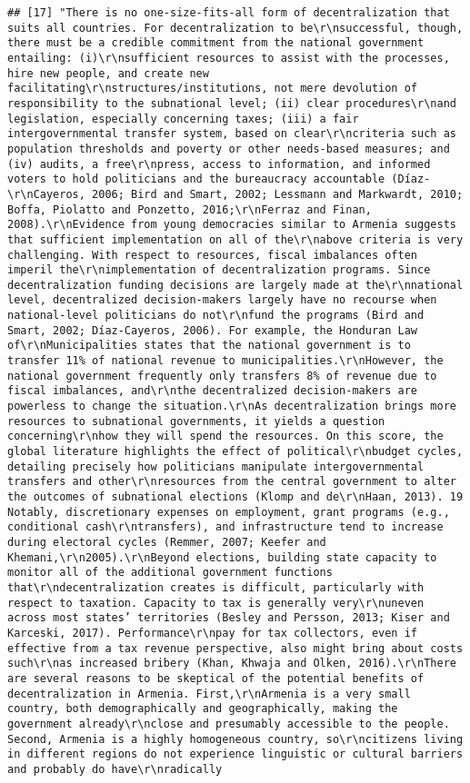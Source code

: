 \documentclass[
]{article}
\begin{document}
\begin{verbatim}
## [17] "There is no one-size-fits-all form of decentralization that suits all countries. For decentralization to be\r\nsuccessful, though, there must be a credible commitment from the national government entailing: (i)\r\nsufficient resources to assist with the processes, hire new people, and create new facilitating\r\nstructures/institutions, not mere devolution of responsibility to the subnational level; (ii) clear procedures\r\nand legislation, especially concerning taxes; (iii) a fair intergovernmental transfer system, based on clear\r\ncriteria such as population thresholds and poverty or other needs-based measures; and (iv) audits, a free\r\npress, access to information, and informed voters to hold politicians and the bureaucracy accountable (Díaz-\r\nCayeros, 2006; Bird and Smart, 2002; Lessmann and Markwardt, 2010; Boffa, Piolatto and Ponzetto, 2016;\r\nFerraz and Finan, 2008).\r\nEvidence from young democracies similar to Armenia suggests that sufficient implementation on all of the\r\nabove criteria is very challenging. With respect to resources, fiscal imbalances often imperil the\r\nimplementation of decentralization programs. Since decentralization funding decisions are largely made at the\r\nnational level, decentralized decision-makers largely have no recourse when national-level politicians do not\r\nfund the programs (Bird and Smart, 2002; Díaz-Cayeros, 2006). For example, the Honduran Law of\r\nMunicipalities states that the national government is to transfer 11% of national revenue to municipalities.\r\nHowever, the national government frequently only transfers 8% of revenue due to fiscal imbalances, and\r\nthe decentralized decision-makers are powerless to change the situation.\r\nAs decentralization brings more resources to subnational governments, it yields a question concerning\r\nhow they will spend the resources. On this score, the global literature highlights the effect of political\r\nbudget cycles, detailing precisely how politicians manipulate intergovernmental transfers and other\r\nresources from the central government to alter the outcomes of subnational elections (Klomp and de\r\nHaan, 2013). 19 Notably, discretionary expenses on employment, grant programs (e.g., conditional cash\r\ntransfers), and infrastructure tend to increase during electoral cycles (Remmer, 2007; Keefer and Khemani,\r\n2005).\r\nBeyond elections, building state capacity to monitor all of the additional government functions that\r\ndecentralization creates is difficult, particularly with respect to taxation. Capacity to tax is generally very\r\nuneven across most states’ territories (Besley and Persson, 2013; Kiser and Karceski, 2017). Performance\r\npay for tax collectors, even if effective from a tax revenue perspective, also might bring about costs such\r\nas increased bribery (Khan, Khwaja and Olken, 2016).\r\nThere are several reasons to be skeptical of the potential benefits of decentralization in Armenia. First,\r\nArmenia is a very small country, both demographically and geographically, making the government already\r\nclose and presumably accessible to the people. Second, Armenia is a highly homogeneous country, so\r\ncitizens living in different regions do not experience linguistic or cultural barriers and probably do have\r\nradically 
\end{verbatim}
\end{document}
